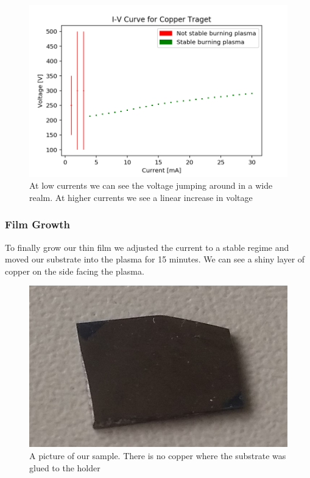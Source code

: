 \documentclass[]{article}
\begin{document}
\begin{figure}
	\centering
	\includegraphics[width=1\linewidth]{Plots/IVcurve}
	\caption{At low currents we can see the voltage jumping around in a wide realm. At higher currents we see a linear increase in voltage}
	\label{fig:ivcurve}
\end{figure}

\subsubsection{Film Growth}
To finally grow our thin film we adjusted the current to a stable regime and moved our substrate into the plasma for 15 minutes. We can see a shiny layer of copper on the side facing the plasma.  

\begin{figure}
	\centering
	\includegraphics[width=0.7\linewidth]{Bilder/sample}
	\caption{A picture of our sample. There is no copper where the substrate was glued to the holder}
	\label{fig:sample}
\end{figure}
	


\newpage
\end{document}
